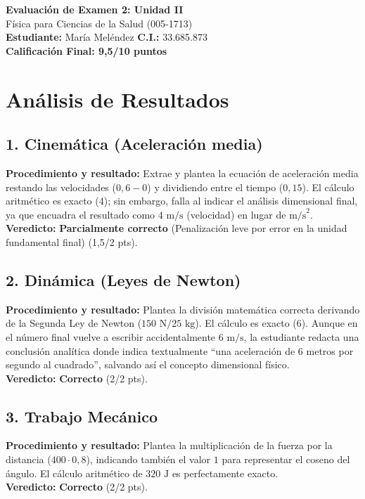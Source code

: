 \documentclass[12pt,letterpaper]{article}
\begin{document}
\begin{center}
    \Large \textbf{Evaluación de Examen 2: Unidad II} \\
    \large Física para Ciencias de la Salud (005-1713) \\
    \vspace{0.5cm}
    \textbf{Estudiante:} María Meléndez \quad \textbf{C.I.:} 33.685.873
    \vspace{0.3cm} \\
    \large \textbf{Calificación Final: 9,5/10 puntos}
\end{center}

\vspace{0.5cm}

\section*{Análisis de Resultados}

\subsection*{1. Cinemática (Aceleración media)}
\textbf{Procedimiento y resultado:} Extrae y plantea la ecuación de aceleración media restando las velocidades ($0,6 - 0$) y dividiendo entre el tiempo ($0,15$). El cálculo aritmético es exacto ($4$); sin embargo, falla al indicar el análisis dimensional final, ya que encuadra el resultado como $4 \text{ m/s}$ (velocidad) en lugar de $\text{m/s}^2$. \\
\textbf{Veredicto:} \textbf{Parcialmente correcto} (Penalización leve por error en la unidad fundamental final) (1,5/2 pts).

\subsection*{2. Dinámica (Leyes de Newton)}
\textbf{Procedimiento y resultado:} Plantea la división matemática correcta derivando de la Segunda Ley de Newton ($150 \text{ N} / 25 \text{ kg}$). El cálculo es exacto ($6$). Aunque en el número final vuelve a escribir accidentalmente $6 \text{ m/s}$, la estudiante redacta una conclusión analítica donde indica textualmente ``una aceleración de 6 metros por segundo al cuadrado'', salvando así el concepto dimensional físico. \\
\textbf{Veredicto:} \textbf{Correcto} (2/2 pts).

\subsection*{3. Trabajo Mecánico}
\textbf{Procedimiento y resultado:} Plantea la multiplicación de la fuerza por la distancia ($400 \cdot 0,8$), indicando también el valor $1$ para representar el coseno del ángulo. El cálculo aritmético de $320 \text{ J}$ es perfectamente exacto. \\
\textbf{Veredicto:} \textbf{Correcto} (2/2 pts).
\end{document}
